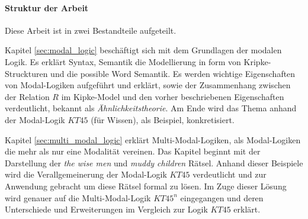 
\paragraph{Struktur der Arbeit} %
\label{par:struktur_der_arbeit}

Diese Arbeit ist in zwei Bestandteile aufgeteilt. 

Kapitel \ref{sec:modal_logic} beschäftigt sich mit dem Grundlagen der modalen Logik. Es erklärt Syntax, Semantik die Modellierung in form von Kripke-Struckturen und die possible Word Semantik. 
Es werden wichtige Eigenschaften von Modal-Logiken aufgeführt und erklärt, sowie der Zusammenhang zwischen der Relation $R$ im Kipke-Model und den vorher beschriebenen Eigenschaften verdeutlicht, bekannt als \emph{Ähnlichkeitstheorie}.
Am Ende wird das Thema anhand der Modal-Logik $KT45$ (für Wissen), als Beispiel, konkretisiert.

Kapitel \ref{sec:multi_modal_logic} erklärt Multi-Modal-Logiken, als Modal-Logiken die mehr als nur eine Modalität vereinen. Das Kapitel beginnt mit der Darstellung der \emph{the wise men} und \emph{muddy children} Rätsel. 
Anhand dieser Beispiele wird die Verallgemeinerung der Modal-Logik $KT45$ verdeutlicht und zur Anwendung gebracht um diese Rätsel formal zu lösen.
Im Zuge dieser Lösung wird genauer auf die Multi-Modal-Logik $KT45^n$ eingegangen und deren Unterschiede und Erweiterungen im Vergleich zur Logik $KT45$ erklärt.





